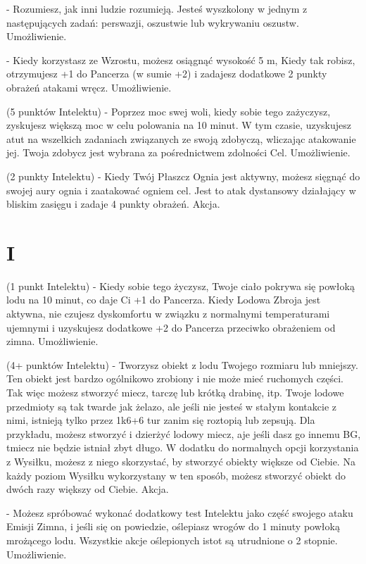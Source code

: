 { - Rozumiesz, jak inni ludzie rozumieją. Jesteś wyszkolony w jednym z następujących zadań: perswazji, oszustwie lub wykrywaniu oszustw. Umożliwienie. 

 - Kiedy korzystasz ze Wzrostu, możesz osiągnąć wysokość 5 m, Kiedy tak robisz, otrzymujesz +1 do Pancerza (w sumie +2) i zadajesz dodatkowe 2 punkty obrażeń atakami wręcz. Umożliwienie. 

 (5 punktów Intelektu) - Poprzez moc swej woli, kiedy sobie tego zażyczysz, zyskujesz większą moc w celu polowania na 10 minut. W tym czasie, uzyskujesz atut na wszelkich zadaniach związanych ze swoją zdobyczą, wliczając atakowanie jej. Twoja zdobycz jest wybrana za pośrednictwem zdolności Cel. Umożliwienie.

 (2 punkty Intelektu) - Kiedy Twój Płaszcz Ognia jest aktywny, możesz sięgnąć do swojej aury ognia i zaatakować ogniem cel. Jest to atak dystansowy działający w bliskim zasięgu i zadaje 4 punkty obrażeń. Akcja. 

\section{I}

 (1 punkt Intelektu) - Kiedy sobie tego życzysz, Twoje ciało pokrywa się powłoką lodu na 10 minut, co daje Ci +1 do Pancerza. Kiedy Lodowa Zbroja jest aktywna, nie czujesz dyskomfortu w związku z normalnymi temperaturami ujemnymi i uzyskujesz dodatkowe +2 do Pancerza przeciwko obrażeniem od zimna. Umożliwienie.

 (4+ punktów Intelektu) - Tworzysz obiekt z lodu Twojego rozmiaru lub mniejszy. Ten obiekt jest bardzo ogólnikowo zrobiony i nie może mieć ruchomych części. Tak więc możesz stworzyć miecz, tarczę lub krótką drabinę, itp. Twoje lodowe przedmioty są tak twarde jak żelazo, ale jeśli nie jesteś w stałym kontakcie z nimi, istnieją tylko przez 1k6+6 tur zanim się roztopią lub zepsują. Dla przykładu, możesz stworzyć i dzierżyć lodowy miecz, aje jeśli dasz go innemu BG, tmiecz nie będzie istniał zbyt długo. W dodatku do normalnych opcji korzystania z Wysiłku, możesz z niego skorzystać, by stworzyć obiekty większe od Ciebie. Na każdy poziom Wysiłku wykorzystany w ten sposób, możesz stworzyć obiekt do dwóch razy większy od Ciebie. Akcja.

 - Możesz spróbować wykonać dodatkowy test Intelektu jako część swojego ataku Emisji Zimna, i jeśli się on powiedzie, oślepiasz wrogów do 1 minuty powłoką mrożącego lodu. Wszystkie akcje oślepionych istot są utrudnione o 2 stopnie. Umożliwienie.

}
